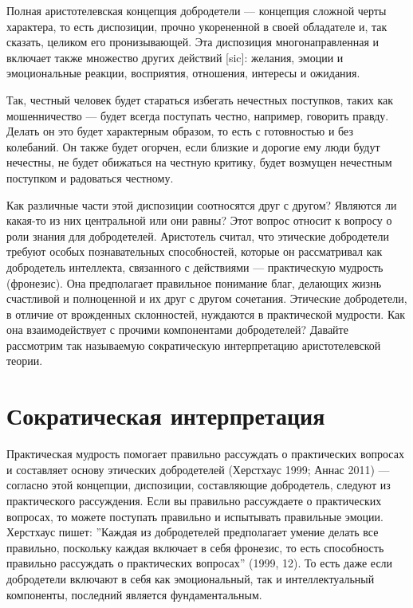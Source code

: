 \documentclass[11pt]{book}
\begin{document}
\smallskip

Полная аристотелевская концепция добродетели --- концепция сложной черты характера, то есть диспозиции, прочно укорененной в своей обладателе и, так сказать, целиком его пронизывающей. Эта диспозиция многонаправленная и включает также множество других действий [sic]: желания, эмоции и эмоциональные реакции, восприятия, отношения, интересы и ожидания.

\smallskip

Так, честный человек будет стараться избегать нечестных поступков, таких как мошенничество --- будет всегда поступать честно, например, говорить правду. Делать он это будет характерным образом, то есть с готовностью и без колебаний. Он также будет огорчен, если близкие и дорогие ему люди будут нечестны, не будет обижаться на честную критику, будет возмущен нечестным поступком и радоваться честному.

Как различные части этой диспозиции соотносятся друг с другом? Являются ли какая-то из них центральной или они равны? Этот вопрос относит к вопросу о роли знания для добродетелей. Аристотель считал, что этические добродетели требуют особых познавательных способностей, которые он рассматривал как добродетель интеллекта, связанного с действиями --- практическую мудрость (фронезис). Она предполагает правильное понимание благ, делающих жизнь счастливой и полноценной и их друг с другом сочетания. Этические добродетели, в отличие от врожденных склонностей, нуждаются в практической мудрости. Как она взаимодействует с прочими компонентами добродетелей? Давайте рассмотрим так называемую сократическую интерпретацию аристотелевской теории.

\section{Сократическая интерпретация}

Практическая мудрость помогает правильно рассуждать о практических вопросах и составляет основу этических добродетелей (Херстхаус 1999; Аннас 2011) --- согласно этой концепции, диспозиции, составляющие добродетель, следуют из практического рассуждения. Если вы правильно рассуждаете о практических вопросах, то можете поступать правильно и испытывать правильные эмоции. Херстхаус пишет: ''Каждая из добродетелей предполагает умение делать все правильно, поскольку каждая включает в себя фронезис, то есть способность правильно рассуждать о практических вопросах'' (1999, 12). То есть даже если добродетели включают в себя как эмоциональный, так и интеллектуальный компоненты, последний является фундаментальным.
\end{document}
